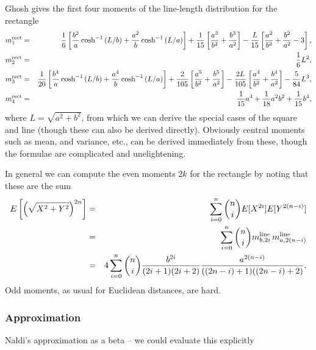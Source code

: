 Ghosh \cite{b.ghosh51:_random_rect} gives the first four moments of
the line-length distribution for the rectangle
\begin{eqnarray}
  \label{eq:rect_moments} 
  m^{\rm rect}_1 & = & \frac{1}{6} \left[ 
                        \frac{b^2}{a} \cosh^{-1}\left( L/b \right) +
                        \frac{a^2}{b} \cosh^{-1}\left( L/a \right) 
                 \right]
                  + \frac{1}{15} \left[ \frac{a^3}{b^2} + \frac{b^3}{a^2} \right]
                  - \frac{L}{15} \left[ \frac{a^2}{b^2} + \frac{b^2}{a^2} -3 \right],
\\
  m^{\rm rect}_2 & = & \frac{1}{6} L^2, \\
  m^{\rm rect}_3 & = & \frac{1}{20} \left[ 
                        \frac{b^4}{a} \cosh^{-1}\left( L/b \right) +
                        \frac{a^4}{b} \cosh^{-1}\left( L/a \right) 
                 \right]
                  + \frac{2}{105} \left[ \frac{a^5}{b^2} + \frac{b^5}{a^2} \right]
                  - \frac{2L}{105} \left[ \frac{a^4}{b^2} + \frac{b^4}{a^2}\right]
                        - \frac{5}{84} L^3, 
\\
  m^{\rm rect}_4 & = & \frac{1}{15} a^4 + \frac{1}{18} a^2 b^2 + \frac{1}{15} b^4,
  \label{eq:rect_moments_end} 
\end{eqnarray}
where $L = \sqrt{a^2 + b^2}$, from which we can derive the special
cases of the square and line (though these can also be derived
directly). Obviously central moments such as mean, and variance, etc.,
can be derived immediately from these, though the formulae are
complicated and unelightening.

In general we can compute the even moments $2k$ for the rectangle by
noting that these are the sum
\begin{eqnarray}
  E\left[ \left( \sqrt{ X^2 + Y^2} \right)^{2n} \right] 
   & = & \sum_{i=0}^{n} \dbinom{n}{i} E[X^{2i}] E[Y^{2(n-i)}]
   \nonumber \\
   & = & \sum_{i=0}^{n} \dbinom{n}{i} m^{\rm line}_{b, 2i} \, m^{\rm line}_{a, 2(n-i)}
   \nonumber \\
   & = & 4 \sum_{i=0}^{n} \dbinom{n}{i} 
            \frac{b^{2i}}{(2i+1)(2i+2)}
            \frac{a^{2(n-i)}}{((2n-i)+1)((2n-i)+2)} .
\end{eqnarray}
Odd moments, as usual for Euclidean distances, are hard.

\subsubsection{Approximation}

Naldi's approximation as a beta -- we could evaluate this explicitly

